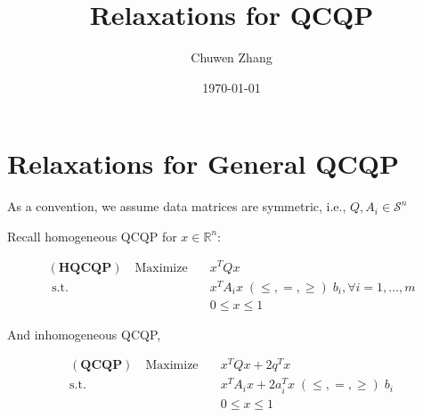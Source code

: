 \documentclass[../main]{subfiles}
\title{Relaxations for QCQP}
\author{Chuwen Zhang}
\date{\today}
\begin{document}
\maketitle
{
  \setcounter{tocdepth}{3}
  \tableofcontents
}

\section{Relaxations for General QCQP}

As a convention, we assume data matrices are symmetric, i.e., \(Q, A_i \in \mathcal{S}^n\)

Recall homogeneous QCQP for \(x \in \mathbb R^n\):

\begin{equation}
  \begin{aligned}
    (\mathbf{HQCQP}) \quad \mathrm{Maximize}\quad & x^{T} Q x                                                      \\
    \text { s.t. }  \quad                         & x^{T} A_{i} x\; (\le, =, \ge) \; b_{i}, \forall i=1, \ldots, m \\
                                                  & 0 \le x\le  1
  \end{aligned}
\end{equation}

And inhomogeneous QCQP,

\begin{equation}\label{eq:inhoqcqp}
  \begin{aligned}
    (\mathbf{QCQP}) \quad \mathrm{Maximize}\quad & x^TQx +2 q^T x                                   \\
    \mathrm{s.t.}  \quad                         & x^{T} A_i x  + 2a_i^Tx   \; (\le, =, \ge) \; b_i \\
                                                 & 0 \le x\le  1
  \end{aligned}
\end{equation}
\end{document}
